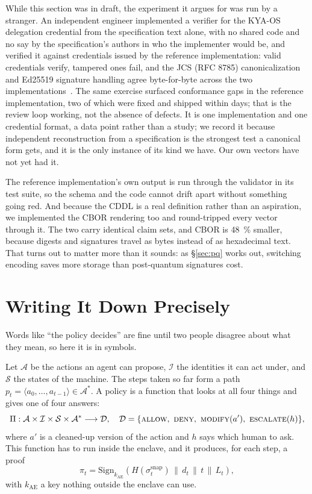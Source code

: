 \documentclass[11pt]{article}
\begin{document}
While this section was in draft, the experiment it argues for was run by a
stranger. An independent engineer implemented a verifier for the KYA-OS
delegation credential from the specification text alone, with no shared code
and no say by the specification's authors in who the implementer would be,
and verified it against credentials issued by the reference implementation:
valid credentials verify, tampered ones fail, and the JCS (RFC 8785)
canonicalization and Ed25519 signature handling agree byte-for-byte across
the two implementations~\cite{izurutoys2026}. The same exercise surfaced
conformance gaps in the reference implementation, two of which were fixed and
shipped within days; that is the review loop working, not the absence of
defects. It is one implementation and one credential format, a data point
rather than a study; we record it because independent reconstruction from a
specification is the strongest test a canonical form gets, and it is the only
instance of its kind we have. Our own vectors have not yet had it.

The reference implementation's own output is run through the validator in its
test suite, so the schema and the code cannot drift apart without something
going red. And because the CDDL is a real definition rather than an aspiration,
we implemented the CBOR rendering too and round-tripped every vector through
it. The two carry identical claim sets, and CBOR is \SI{48}{\percent} smaller,
because digests and signatures travel as bytes instead of as hexadecimal text.
That turns out to matter more than it sounds: as \S\ref{sec:pq} works out,
switching encoding saves more storage than post-quantum signatures cost.

\section{Writing It Down Precisely}
\label{sec:formal}

Words like ``the policy decides'' are fine until two people disagree about
what they mean, so here it is in symbols.

Let $\mathcal{A}$ be the actions an agent can propose, $\mathcal{I}$ the
identities it can act under, and $\mathcal{S}$ the states of the machine. The
steps taken so far form a path $p_t = \langle a_0, \dots, a_{t-1}\rangle \in
\mathcal{A}^{*}$. A policy is a function that looks at all four things and
gives one of four answers:
\begin{equation}
\Pi : \mathcal{A} \times \mathcal{I} \times \mathcal{S} \times \mathcal{A}^{*}
      \longrightarrow \mathcal{D},
\quad
\mathcal{D} = \{\textsc{allow},\ \textsc{deny},\
               \textsc{modify}(a'),\ \textsc{escalate}(h)\},
\end{equation}
where $a'$ is a cleaned-up version of the action and $h$ says which human to
ask. This function has to run inside the enclave, and it produces, for each
step, a proof
\begin{equation}
\pi_t = \mathrm{Sign}_{k_{\mathrm{AE}}}\!\left(
  H(\sigma_t^{\mathrm{snap}}) \,\|\, d_t \,\|\, t \,\|\, L_t \right),
\end{equation}
with $k_{\mathrm{AE}}$ a key nothing outside the enclave can use.
\end{document}
